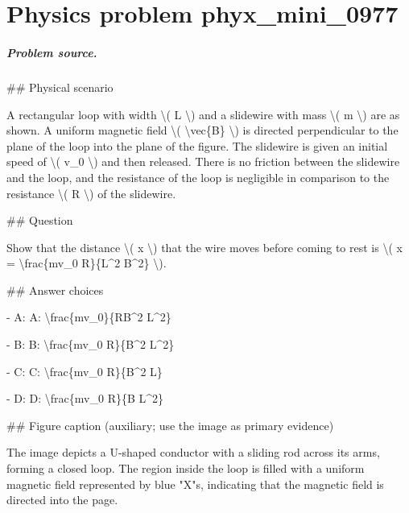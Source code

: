 
\chapter{Physics problem phyx\_mini\_0977}
\label{ch:PhyXMiniProblems_problem_phyx_mini_0977}

\paragraph{Problem source.}
\#\# Physical scenario

A rectangular loop with width \textbackslash{}( L \textbackslash{}) and a slidewire with mass \textbackslash{}( m \textbackslash{}) are as shown. A uniform magnetic field \textbackslash{}( \textbackslash{}vec\{B\} \textbackslash{}) is directed perpendicular to the plane of the loop into the plane of the figure. The slidewire is given an initial speed of \textbackslash{}( v\_0 \textbackslash{}) and then released. There is no friction between the slidewire and the loop, and the resistance of the loop is negligible in comparison to the resistance \textbackslash{}( R \textbackslash{}) of the slidewire.

\#\# Question

Show that the distance \textbackslash{}( x \textbackslash{}) that the wire moves before coming to rest is \textbackslash{}( x = \textbackslash{}frac\{mv\_0 R\}\{L\textasciicircum{}2 B\textasciicircum{}2\} \textbackslash{}).

\#\# Answer choices

- A: A: \textbackslash{}frac\{mv\_0\}\{RB\textasciicircum{}2 L\textasciicircum{}2\}

- B: B: \textbackslash{}frac\{mv\_0 R\}\{B\textasciicircum{}2 L\textasciicircum{}2\}

- C: C: \textbackslash{}frac\{mv\_0 R\}\{B\textasciicircum{}2 L\}

- D: D: \textbackslash{}frac\{mv\_0 R\}\{B L\textasciicircum{}2\}

\#\# Figure caption (auxiliary; use the image as primary evidence)

The image depicts a U-shaped conductor with a sliding rod across its arms, forming a closed loop. The region inside the loop is filled with a uniform magnetic field represented by blue "X"s, indicating that the magnetic field is directed into the page. 

